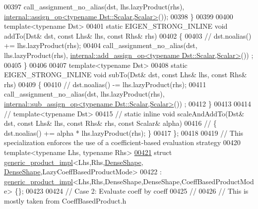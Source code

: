 \begin{DoxyCode}
00397     call\_assignment\_no\_alias(dst, lhs.lazyProduct(rhs), 
      \hyperlink{struct_eigen_1_1internal_1_1assign__op}{internal::assign\_op<typename Dst::Scalar,Scalar>}());
00398   \}
00399   
00400   \textcolor{keyword}{template}<\textcolor{keyword}{typename} Dst>
00401   \textcolor{keyword}{static} EIGEN\_STRONG\_INLINE \textcolor{keywordtype}{void} addTo(Dst& dst, \textcolor{keyword}{const} Lhs& lhs, \textcolor{keyword}{const} Rhs& rhs)
00402   \{
00403     \textcolor{comment}{// dst.noalias() += lhs.lazyProduct(rhs);}
00404     call\_assignment\_no\_alias(dst, lhs.lazyProduct(rhs), 
      \hyperlink{struct_eigen_1_1internal_1_1add__assign__op}{internal::add\_assign\_op<typename Dst::Scalar,Scalar>}())
      ;
00405   \}
00406   
00407   \textcolor{keyword}{template}<\textcolor{keyword}{typename} Dst>
00408   \textcolor{keyword}{static} EIGEN\_STRONG\_INLINE \textcolor{keywordtype}{void} subTo(Dst& dst, \textcolor{keyword}{const} Lhs& lhs, \textcolor{keyword}{const} Rhs& rhs)
00409   \{
00410     \textcolor{comment}{// dst.noalias() -= lhs.lazyProduct(rhs);}
00411     call\_assignment\_no\_alias(dst, lhs.lazyProduct(rhs), 
      \hyperlink{struct_eigen_1_1internal_1_1sub__assign__op}{internal::sub\_assign\_op<typename Dst::Scalar,Scalar>}())
      ;
00412   \}
00413   
00414 \textcolor{comment}{//   template<typename Dst>}
00415 \textcolor{comment}{//   static inline void scaleAndAddTo(Dst& dst, const Lhs& lhs, const Rhs& rhs, const Scalar& alpha)}
00416 \textcolor{comment}{//   \{ dst.noalias() += alpha * lhs.lazyProduct(rhs); \}}
00417 \};
00418 
00419 \textcolor{comment}{// This specialization enforces the use of a coefficient-based evaluation strategy}
00420 \textcolor{keyword}{template}<\textcolor{keyword}{typename} Lhs, \textcolor{keyword}{typename} Rhs>
\hyperlink{struct_eigen_1_1internal_1_1generic__product__impl_3_01_lhs_00_01_rhs_00_01_dense_shape_00_01_dee19e42566a0e6a2965776a41711daa09}{00421} \textcolor{keyword}{struct }\hyperlink{struct_eigen_1_1internal_1_1generic__product__impl}{generic\_product\_impl}<Lhs,Rhs,\hyperlink{struct_eigen_1_1_dense_shape}{DenseShape},
      \hyperlink{struct_eigen_1_1_dense_shape}{DenseShape},LazyCoeffBasedProductMode>
00422   : \hyperlink{struct_eigen_1_1internal_1_1generic__product__impl}{generic\_product\_impl}<Lhs,Rhs,DenseShape,DenseShape,CoeffBasedProductMode> \{\};
00423 
00424 \textcolor{comment}{// Case 2: Evaluate coeff by coeff}
00425 \textcolor{comment}{//}
00426 \textcolor{comment}{// This is mostly taken from CoeffBasedProduct.h}

\end{DoxyCode}
